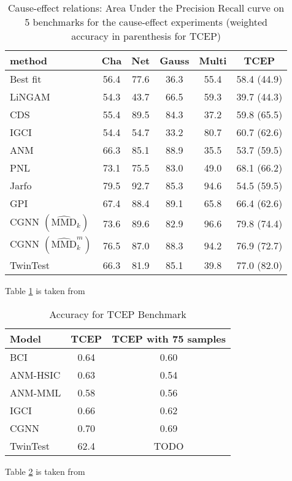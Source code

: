 \begin{table}[H]
    \centering


    \begin{tabular}{lccccc}
        \hline method & Cha & Net & Gauss & Multi & TCEP \\
        \hline Best fit & 56.4 & 77.6 & 36.3 & 55.4 & 58.4 (44.9) \\
        LiNGAM & 54.3 & 43.7 & 66.5 & 59.3 & 39.7 (44.3) \\
        CDS & 55.4 & 89.5 & 84.3 & 37.2 & 59.8 (65.5) \\
        IGCI & 54.4 & 54.7 & 33.2 & 80.7 & 60.7 (62.6) \\
        ANM & 66.3 & 85.1 & 88.9 & 35.5 & 53.7 (59.5) \\
        PNL & 73.1 & 75.5 & 83.0 & 49.0 & 68.1 (66.2) \\
        Jarfo & 79.5 & 92.7 & 85.3 & 94.6 & 54.5 (59.5) \\
        GPI & 67.4 & 88.4 & 89.1 & 65.8 & 66.4 (62.6) \\
        CGNN $\left(\widehat{\mathrm{MMD}}_{k}\right)$ & 73.6 & 89.6 & 82.9 & 96.6 & 79.8 (74.4) \\
        CGNN $\left(\widehat{\mathrm{MMD}}_{k}^{m}\right)$ & 76.5 & 87.0 & 88.3 & 94.2 & 76.9 (72.7) \\
        \hline TwinTest & 66.3 & 81.9 & 85.1 & 39.8 & 77.0 (82.0) \\
        \hline
    \end{tabular}

    \caption{Cause-effect relations: Area Under the Precision Recall curve
     on 5 benchmarks for the cause-effect experiments (weighted accuracy 
     in parenthesis for TCEP)}   
    \label{tab:AUPR}
\end{table}

Table \ref{tab:AUPR} is taken from \cite{goudet2017causal}

\begin{table}[H]
    \centering

    \begin{tabular}{lcc}
        \hline Model & TCEP & TCEP with 75 samples \\
        \hline BCI & 0.64 & 0.60 \\
        ANM-HSIC & 0.63 & 0.54 \\
        ANM-MML & 0.58 & 0.56 \\
        IGCI & 0.66 & 0.62 \\
        CGNN & 0.70 & 0.69 \\
        \hline TwinTest & 62.4 & TODO \\
        \hline
    \end{tabular}
    \caption{Accuracy for TCEP Benchmark} 
    \label{tab:acc}
\end{table}

Table \ref{tab:acc} is taken from \cite{kurthen2018bayesian}
